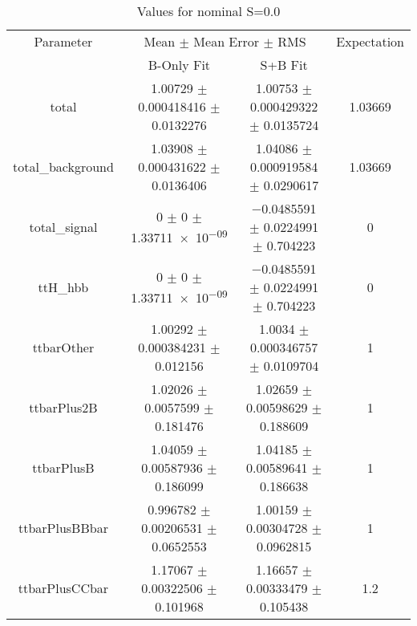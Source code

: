 \begin{table}
\centering
\caption{Values for nominal S=0.0}
\begin{tabular}{cccc}
\toprule
Parameter & \multicolumn{2}{c}{Mean $\pm$ Mean Error $\pm$ RMS} & Expectation\\
 & B-Only Fit & S+B Fit & \\
\midrule
total & \num{1.00729} $\pm$ \num{0.000418416} $\pm$ \num{0.0132276} & \num{1.00753} $\pm$ \num{0.000429322} $\pm$ \num{0.0135724} & \num{1.03669}\\
total\_background & \num{1.03908} $\pm$ \num{0.000431622} $\pm$ \num{0.0136406} & \num{1.04086} $\pm$ \num{0.000919584} $\pm$ \num{0.0290617} & \num{1.03669}\\
total\_signal & \num{0} $\pm$ \num{0} $\pm$ \num{1.33711e-09} & \num{-0.0485591} $\pm$ \num{0.0224991} $\pm$ \num{0.704223} & \num{0}\\
ttH\_hbb & \num{0} $\pm$ \num{0} $\pm$ \num{1.33711e-09} & \num{-0.0485591} $\pm$ \num{0.0224991} $\pm$ \num{0.704223} & \num{0}\\
ttbarOther & \num{1.00292} $\pm$ \num{0.000384231} $\pm$ \num{0.012156} & \num{1.0034} $\pm$ \num{0.000346757} $\pm$ \num{0.0109704} & \num{1}\\
ttbarPlus2B & \num{1.02026} $\pm$ \num{0.0057599} $\pm$ \num{0.181476} & \num{1.02659} $\pm$ \num{0.00598629} $\pm$ \num{0.188609} & \num{1}\\
ttbarPlusB & \num{1.04059} $\pm$ \num{0.00587936} $\pm$ \num{0.186099} & \num{1.04185} $\pm$ \num{0.00589641} $\pm$ \num{0.186638} & \num{1}\\
ttbarPlusBBbar & \num{0.996782} $\pm$ \num{0.00206531} $\pm$ \num{0.0652553} & \num{1.00159} $\pm$ \num{0.00304728} $\pm$ \num{0.0962815} & \num{1}\\
ttbarPlusCCbar & \num{1.17067} $\pm$ \num{0.00322506} $\pm$ \num{0.101968} & \num{1.16657} $\pm$ \num{0.00333479} $\pm$ \num{0.105438} & \num{1.2}\\
\bottomrule
\end{tabular}
\end{table}